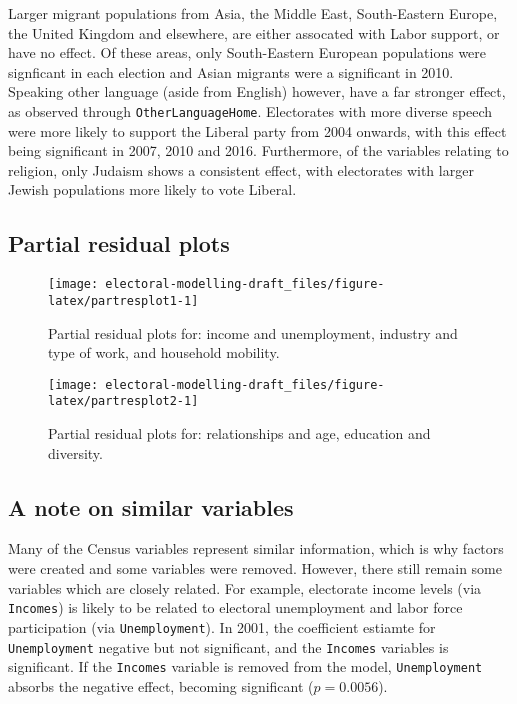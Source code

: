 \documentclass[openany]{book}
\begin{document}
Larger migrant populations from Asia, the Middle East, South-Eastern Europe, the United Kingdom and elsewhere, are either assocated with Labor support, or have no effect. Of these areas, only South-Eastern European populations were signficant in each election and Asian migrants were a significant in 2010. Speaking other language (aside from English) however, have a far stronger effect, as observed through \texttt{OtherLanguageHome}. Electorates with more diverse speech were more likely to support the Liberal party from 2004 onwards, with this effect being significant in 2007, 2010 and 2016. Furthermore, of the variables relating to religion, only Judaism shows a consistent effect, with electorates with larger Jewish populations more likely to vote Liberal.

\hypertarget{partial-residual-plots}{%
\subsection{Partial residual plots}\label{partial-residual-plots}}

\begin{figure}[h]

{\centering \texttt{[image: electoral-modelling-draft\_files/figure-latex/partresplot1-1]} 

}

\caption{Partial residual plots for: income and unemployment, industry and type of work, and household mobility.}\label{fig:partresplot1}
\end{figure}

\begin{figure}[h]

{\centering \texttt{[image: electoral-modelling-draft\_files/figure-latex/partresplot2-1]} 

}

\caption{Partial residual plots for: relationships and age, education and diversity.}\label{fig:partresplot2}
\end{figure}

\hypertarget{a-note-on-similar-variables}{%
\subsection{A note on similar variables}\label{a-note-on-similar-variables}}

Many of the Census variables represent similar information, which is why factors were created and some variables were removed. However, there still remain some variables which are closely related. For example, electorate income levels (via \texttt{Incomes}) is likely to be related to electoral unemployment and labor force participation (via \texttt{Unemployment}). In 2001, the coefficient estiamte for \texttt{Unemployment} negative but not significant, and the \texttt{Incomes} variables is significant. If the \texttt{Incomes} variable is removed from the model, \texttt{Unemployment} absorbs the negative effect, becoming significant (\(p = 0.0056\)).
\end{document}
